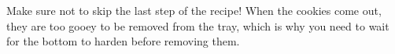 \begin{recipe}
\hint
{
Make sure not to skip the last step of the recipe!
When the cookies come out, they are too gooey to be removed from the tray, which is why you need to wait for the bottom to harden before removing them.
}

\end{recipe}

